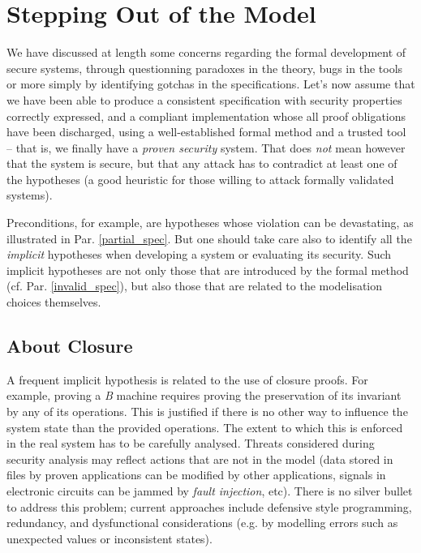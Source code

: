 \documentclass[conference]{IEEEtran}
\begin{document}
\section{Stepping Out of the Model}\label{stepping_out}

We have discussed at length some concerns regarding the formal development of secure systems,
through questionning paradoxes in the theory, bugs in the tools or more simply by identifying
gotchas in the specifications. Let's now assume that we have been able to produce a consistent
specification with security properties correctly expressed, and a compliant implementation
whose all proof obligations have been discharged, using a well-established formal method and a
trusted tool -- that is, we finally have a \emph{proven security} system. That does \emph{not}
mean however that the system is secure, but that any attack has to contradict at least one of
the hypotheses (a good heuristic for those willing to attack formally validated systems).

Preconditions, for example, are hypotheses whose violation can be devastating, as illustrated
in Par. \ref{partial_spec}. But one should take care also to identify all the \emph{implicit}
hypotheses when developing a system or evaluating its security. Such implicit hypotheses are
not only those that are introduced by the formal method (cf. Par. \ref{invalid_spec}), but
also those that are related to the modelisation choices themselves.

\subsection{About Closure}\label{closure}

A frequent implicit hypothesis is related to the use of closure proofs. For example, proving a
\emph{B} machine requires proving the preservation of its invariant by any of its operations.
This is justified if there is no other way to influence the system state than the provided
operations. The extent to which this is enforced in the real system has to be carefully
analysed. Threats considered during security analysis may reflect actions that are not in the
model (data stored in files by proven applications can be modified by other applications,
signals in electronic circuits can be jammed by \emph{fault injection}, etc). There is no
silver bullet to address this problem; current approaches include defensive style programming,
redundancy, and dysfunctional considerations (e.g. by modelling errors such as unexpected
values or inconsistent states).
\end{document}
